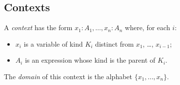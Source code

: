 
\subsection{Contexts}

A \emph{context} has the form $x_1 : A_1, \ldots, x_n : A_n$ where, for each $i$:
\begin{itemize}
\item $x_i$ is a variable of kind $K_i$ distinct from $x_1$, \ldots, $x_{i-1}$;
\item $A_i$ is an expression whose kind is the parent of $K_i$.
\end{itemize}
The \emph{domain} of this context is the alphabet $\{ x_1, \ldots, x_n \}$.

